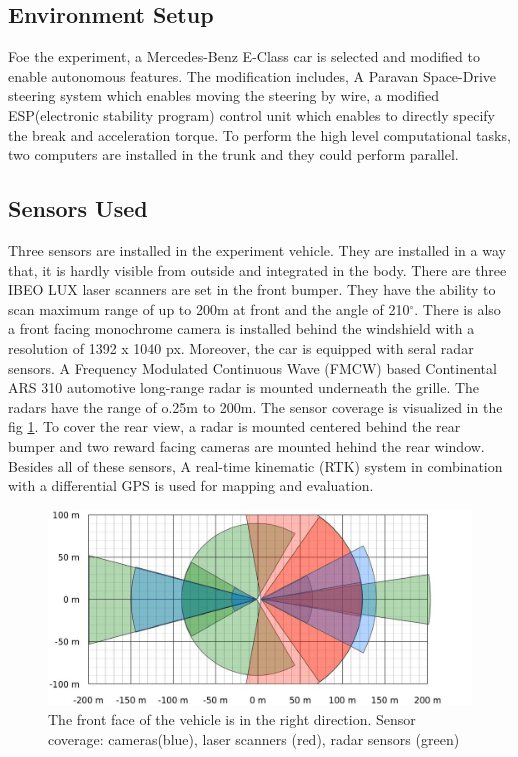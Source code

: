 \subsection{Environment Setup}
Foe the experiment, a Mercedes-Benz E-Class car is selected and modified to enable autonomous features. The modification includes, A Paravan Space-Drive steering system which enables moving the steering by wire, a modified ESP(electronic stability program) control unit which enables to directly specify the break and acceleration torque\cite{Kunz_2015}. To perform the high level computational tasks, two computers are installed in the trunk and they could perform parallel.

\subsection{Sensors Used}
Three sensors are installed in the experiment vehicle. They are installed in a way that, it is hardly visible from outside and integrated in the body. There are three IBEO LUX laser scanners are set in the front bumper. They have the ability to scan maximum range of up to 200m at front and the angle of 210$^{\circ}$. There is also a front facing monochrome camera is installed behind the windshield with a resolution of 1392 x 1040 px. Moreover, the car is equipped with seral radar sensors. A Frequency Modulated Continuous Wave (FMCW) based Continental ARS 310 automotive long-range radar is mounted underneath the grille\cite{Kunz_2015}. The radars have the range of o.25m to 200m. The sensor coverage is visualized in the fig \ref{fig:sensor_covarage_Independent}. To cover the rear view, a radar is mounted centered behind the rear bumper and two reward facing cameras are mounted hehind the rear window. Besides all of these sensors, A real-time kinematic (RTK) system in combination with a differential GPS is used for mapping and evaluation\cite{Kunz_2015}.
\begin{figure}
  \centering
  \includegraphics[width=.6\textwidth]{src/pic/sensor_covarage_Independent.png}
  \caption{The front face of the vehicle is in the right direction.  Sensor coverage: cameras(blue), laser scanners (red), radar sensors (green) \cite{Kunz_2015}}
  \label{fig:sensor_covarage_Independent}
\end{figure}
